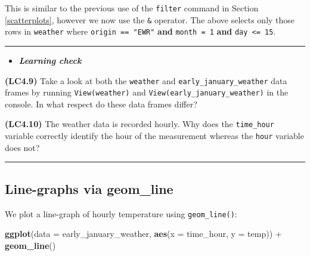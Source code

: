\documentclass[]{tufte-book}
\newenvironment{Shaded}{\begin{snugshade}}{\end{snugshade}}
\newcommand{\KeywordTok}[1]{\textcolor[rgb]{0.13,0.29,0.53}{\textbf{{#1}}}}
\newcommand{\DataTypeTok}[1]{\textcolor[rgb]{0.13,0.29,0.53}{{#1}}}
\newcommand{\DecValTok}[1]{\textcolor[rgb]{0.00,0.00,0.81}{{#1}}}
\newcommand{\StringTok}[1]{\textcolor[rgb]{0.31,0.60,0.02}{{#1}}}
\newcommand{\NormalTok}[1]{{#1}}
\let\oldrule=\rule
\renewcommand{\rule}[1]{\oldrule{\linewidth}}
\newenvironment{rmdblock}[1]
  {\begin{shaded*}
  \begin{itemize}
  \renewcommand{\labelitemi}{
    \raisebox{-.7\height}[0pt][0pt]{
    }
  }
  \item
  }
  {
  \end{itemize}
  \end{shaded*}
  }
\newenvironment{learncheck}
  {\begin{rmdblock}{warning}}
  {\end{rmdblock}}
\begin{document}
\begin{Shaded}
\end{Shaded}

This is similar to the previous use of the \texttt{filter} command in
Section \ref{scatterplots}, however we now use the \texttt{\&} operator.
The above selects only those rows in \texttt{weather} where
\texttt{origin\ ==\ "EWR"} \textbf{and} \texttt{month\ =\ 1}
\textbf{and} \texttt{day\ \textless{}=\ 15}.

\begin{center}\rule{0.5\linewidth}{\linethickness}\end{center}

\begin{learncheck}
\textbf{\emph{Learning check}}
\end{learncheck}

\textbf{(LC4.9)} Take a look at both the \texttt{weather} and
\texttt{early\_january\_weather} data frames by running
\texttt{View(weather)} and \texttt{View(early\_january\_weather)} in the
console. In what respect do these data frames differ?

\textbf{(LC4.10)} The weather data is recorded hourly. Why does the
\texttt{time\_hour} variable correctly identify the hour of the
measurement whereas the \texttt{hour} variable does not?

\begin{center}\rule{0.5\linewidth}{\linethickness}\end{center}

\subsection{Line-graphs via geom\_line}\label{geomline}

We plot a line-graph of hourly temperature using \texttt{geom\_line()}:

\begin{Shaded}
\begin{Highlighting}[]
\KeywordTok{ggplot}\NormalTok{(}\DataTypeTok{data =} \NormalTok{early_january_weather, }\KeywordTok{aes}\NormalTok{(}\DataTypeTok{x =} \NormalTok{time_hour, }\DataTypeTok{y =} \NormalTok{temp)) +}
\StringTok{  }\KeywordTok{geom_line}\NormalTok{()}
\end{Highlighting}
\end{Shaded}
\end{document}
